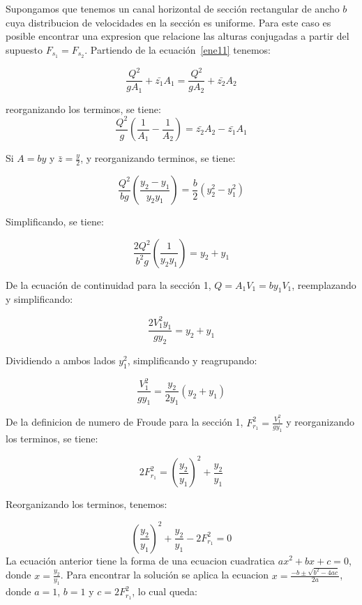 \documentclass[11pt, oneside]{article}
\begin{document}
Supongamos que tenemos un canal horizontal de secci\'on rectangular de ancho $b$ cuya distribucion de velocidades en la secci\'on es uniforme. Para este caso es posible encontrar una expresion que relacione las alturas conjugadas a partir del supuesto $F_{s_1} = F_{s_2}$. Partiendo de la ecuaci\'on~\ref{ene11} tenemos:

$$
\frac{Q^2}{g A_1} + \bar{z_1}A_1 = \frac{Q^2}{g A_2} + \bar{z_2}A_2 
$$

reorganizando los terminos, se tiene:
$$
\frac{Q^2}{g}\left( \frac{1}{A_1} - \frac{1}{A_2} \right) = \bar{z_2}A_2 - \bar{z_1}A_1 
$$

Si $A=by$ y $\bar{z}=\frac{y}{2}$, y reorganizando terminos, se tiene:

$$
\frac{Q^2}{bg}\left( \frac{y_2 - y_1 }{y_2 y_1}\right) = \frac{b}{2}\left( y_2^2 - y_1^2 \right)
$$

Simplificando, se tiene:

$$
\frac{2 Q^2}{b^2 g}\left( \frac{1}{y_2 y_1}\right) = y_2 + y_1
$$

De la ecuaci\'on de continuidad para la secci\'on 1, $Q=A_1 V_1 = by_1 V_1$, reemplazando y simplificando:

$$
\frac{2 V_1^2 y_1}{g y_2} = y_2 + y_1
$$

Dividiendo a ambos lados $y_1^2$, simplificando y reagrupando:

$$
\frac{V_1^2}{g y_1} = \frac{y_2}{2 y_1}\left( y_2 + y_1 \right)
$$

De la definicion de numero de Froude para la secci\'on 1, $F_{r_1}^2 =\frac{V_1^2}{g y_1}$ y reorganizando los terminos, se tiene:

$$
2 F_{r_1}^2 = \left( \frac{y_2}{y_1} \right)^2 + \frac{y_2}{y_1}
$$

Reorganizando los terminos, tenemos:

$$
\left( \frac{y_2}{y_1} \right)^2 + \frac{y_2}{y_1} - 2 F_{r_1}^2 =0
$$
La ecuaci\'on anterior tiene la forma de una ecuacion cuadratica $ax^2 + bx + c =0 $, donde $x= \frac{y_2}{y_1}$. Para encontrar la soluci\'on se aplica la ecuacion $x = \frac{-b \pm \sqrt{b^2-4ac}}{2a}$, donde $a=1$, $b=1$ y $c=2F_{r_1}^2$, lo cual queda:
\end{document}
